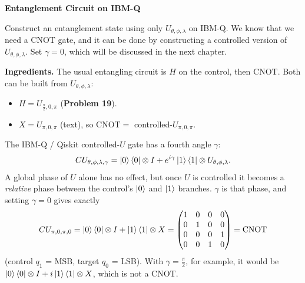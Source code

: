 \documentclass[a4paper, 10pt]{article}
\begin{document}
\begin{problem}
\textbf{Entanglement Circuit on IBM-Q}
\par Construct an entanglement state using only \( U_{\theta, \phi, \lambda} \) on IBM-Q.
We know that we need a CNOT gate, and it can be done by constructing a controlled version of \( U_{\theta, \phi, \lambda} \).
Set \( \gamma = 0 \), which will be discussed in the next chapter.
\end{problem}

\begin{solution}
	\noindent \textbf{Ingredients.} The usual entangling circuit is \( H \) on the control, then CNOT. Both can be built from \( U_{\theta, \phi, \lambda} \):
	\begin{itemize}
		\item \( H = U_{\frac{\pi}{2}, 0, \pi} \) (\textbf{Problem 19}).
		\item \( X = U_{\pi, 0, \pi} \) (text), so \( \mathrm{CNOT} = \) controlled-\( U_{\pi, 0, \pi} \).
	\end{itemize}
	The IBM-Q / Qiskit controlled-\( U \) gate has a fourth angle \( \gamma \):
	\[
		CU_{\theta, \phi, \lambda, \gamma} = \ket{0}\bra{0} \otimes I + e^{i\gamma}\ket{1}\bra{1} \otimes U_{\theta, \phi, \lambda}.
	\]
	A global phase of \( U \) alone has no effect, but once \( U \) is controlled it becomes a \emph{relative} phase between the control's \( \ket{0} \) and \( \ket{1} \) branches. \( \gamma \) is that phase, and setting \( \gamma = 0 \) gives exactly
	\[
		CU_{\pi, 0, \pi, 0} = \ket{0}\bra{0} \otimes I + \ket{1}\bra{1} \otimes X = \begin{pmatrix}
			1 & 0 & 0 & 0 \\
			0 & 1 & 0 & 0 \\
			0 & 0 & 0 & 1 \\
			0 & 0 & 1 & 0
		\end{pmatrix} = \mathrm{CNOT}
	\]
	(control \( q_1 \) = MSB, target \( q_0 \) = LSB). With \( \gamma = \tfrac{\pi}{2} \), for example, it would be \( \ket{0}\bra{0} \otimes I + i\ket{1}\bra{1} \otimes X \), which is not a CNOT.

	\myspace


\end{solution}
\end{document}
